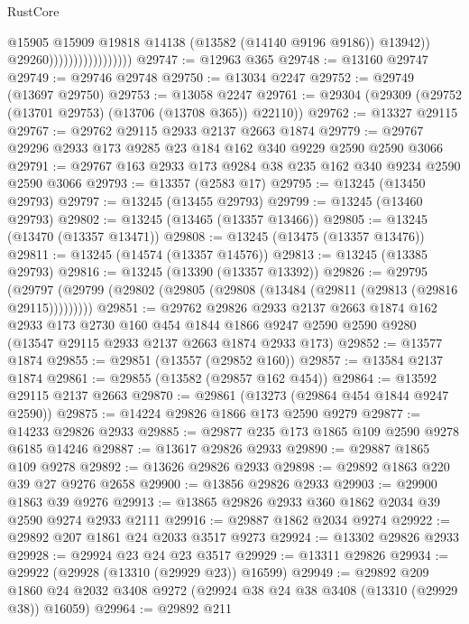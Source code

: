 \begin{lexlean}{RustCore}
\begin{coremodule}
                                          @15905
                                          @15909
                                          @19818
                                          @14138
                                          (@13582 (@14140 @9196 @9186))
                                          @13942))
                                      @29260)))))))))))))))))
@29747 := @12963 @365
@29748 := @13160 @29747
@29749 := @29746 @29748
@29750 := @13034 @2247
@29752 := @29749 (@13697 @29750)
@29753 := @13058 @2247
@29761 := @29304 (@29309 (@29752 (@13701 @29753) (@13706 (@13708 @365)) @22110))
@29762 := @13327 @29115
@29767 := @29762 @29115 @2933 @2137 @2663 @1874
@29779 := @29767 @29296 @2933 @173 @9285 @23 @184 @162 @340 @9229 @2590 @2590 @3066
@29791 := @29767 @163 @2933 @173 @9284 @38 @235 @162 @340 @9234 @2590 @2590 @3066
@29793 := @13357 (@2583 @17)
@29795 := @13245 (@13450 @29793)
@29797 := @13245 (@13455 @29793)
@29799 := @13245 (@13460 @29793)
@29802 := @13245 (@13465 (@13357 @13466))
@29805 := @13245 (@13470 (@13357 @13471))
@29808 := @13245 (@13475 (@13357 @13476))
@29811 := @13245 (@14574 (@13357 @14576))
@29813 := @13245 (@13385 @29793)
@29816 := @13245 (@13390 (@13357 @13392))
@29826 := @29795
    (@29797 (@29799 (@29802 (@29805 (@29808 (@13484 (@29811 (@29813 (@29816 @29115)))))))))
@29851 := @29762
    @29826
    @2933
    @2137
    @2663
    @1874
    @162
    @2933
    @173
    @2730
    @160
    @454
    @1844
    @1866
    @9247
    @2590
    @2590
    @9280
    (@13547 @29115 @2933 @2137 @2663 @1874 @2933 @173)
@29852 := @13577 @1874
@29855 := @29851 (@13557 (@29852 @160))
@29857 := @13584 @2137 @1874
@29861 := @29855 (@13582 (@29857 @162 @454))
@29864 := @13592 @29115 @2137 @2663
@29870 := @29861 (@13273 (@29864 @454 @1844 @9247 @2590))
@29875 := @14224 @29826 @1866 @173 @2590 @9279
@29877 := @14233 @29826 @2933
@29885 := @29877 @235 @173 @1865 @109 @2590 @9278 @6185 @14246
@29887 := @13617 @29826 @2933
@29890 := @29887 @1865 @109 @9278
@29892 := @13626 @29826 @2933
@29898 := @29892 @1863 @220 @39 @27 @9276 @2658
@29900 := @13856 @29826 @2933
@29903 := @29900 @1863 @39 @9276
@29913 := @13865 @29826 @2933 @360 @1862 @2034 @39 @2590 @9274 @2933 @2111
@29916 := @29887 @1862 @2034 @9274
@29922 := @29892 @207 @1861 @24 @2033 @3517 @9273
@29924 := @13302 @29826 @2933
@29928 := @29924 @23 @24 @23 @3517
@29929 := @13311 @29826
@29934 := @29922 (@29928 (@13310 (@29929 @23)) @16599)
@29949 := @29892
    @209
    @1860
    @24
    @2032
    @3408
    @9272
    (@29924 @38 @24 @38 @3408 (@13310 (@29929 @38)) @16059)
@29964 := @29892
    @211

\end{coremodule}
\end{lexlean}
